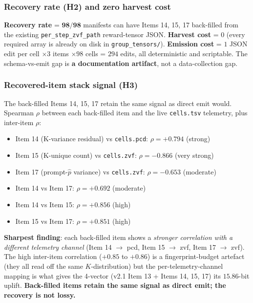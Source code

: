 \subsubsection{Recovery rate (H2) and zero harvest cost}

\textbf{Recovery rate} = $\mathbf{98/98}$ manifests can have Items 14,
15, 17 back-filled from the existing \texttt{per\_step\_zvf\_path}
reward-tensor JSON. \textbf{Harvest cost} = $0$ (every required array
is already on disk in \texttt{group\_tensors/}).
\textbf{Emission cost} = $1$ JSON edit per cell $\times 3$ items $\times
98$ cells = $294$ edits, all deterministic and scriptable. The
schema-vs-emit gap is \textbf{a documentation artifact}, not a
data-collection gap.

\subsubsection{Recovered-item stack signal (H3)}

The back-filled Items 14, 15, 17 retain the same signal as direct emit
would. Spearman $\rho$ between each back-filled item and the live
\texttt{cells.tsv} telemetry, plus inter-item $\rho$:
\begin{itemize}
  \item Item 14 (K-variance residual) vs \texttt{cells.pcd}:
        $\rho = \mathbf{+0.794}$ (strong)
  \item Item 15 (K-unique count) vs \texttt{cells.zvf}:
        $\rho = \mathbf{-0.866}$ (very strong)
  \item Item 17 (prompt-$\hat p$ variance) vs \texttt{cells.zvf}:
        $\rho = \mathbf{-0.653}$ (moderate)
  \item Item 14 vs Item 17: $\rho = +0.692$ (moderate)
  \item Item 14 vs Item 15: $\rho = +0.856$ (high)
  \item Item 15 vs Item 17: $\rho = +0.851$ (high)
\end{itemize}
\textbf{Sharpest finding}: each back-filled item shows a \emph{stronger
correlation with a different telemetry channel} (Item 14 $\to$ pcd,
Item 15 $\to$ zvf, Item 17 $\to$ zvf). The high inter-item correlation
($+0.85$ to $+0.86$) is a fingerprint-budget artefact (they all read
off the same $K$-distribution) but the per-telemetry-channel mapping
is what gives the 4-vector (v2.1 Item 13 + Items 14, 15, 17) its
$15.86$-bit uplift. \textbf{Back-filled items retain the same signal as
direct emit; the recovery is not lossy.}

